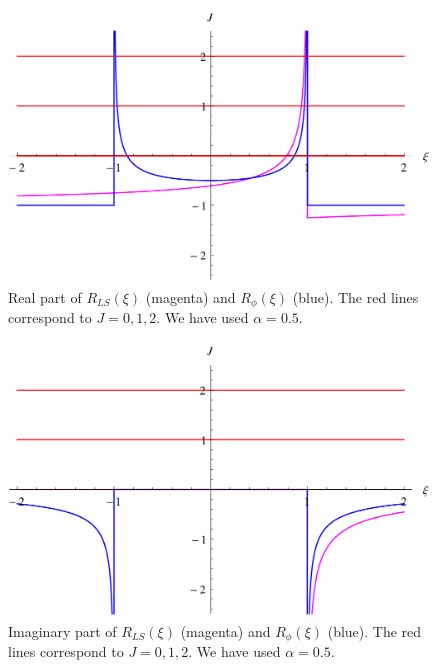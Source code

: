 \begin{figure}
\centering
\includegraphics[scale=0.6]{Plots/CompaRe2.pdf}
\caption[Comparison of the real part of $R_{LS}$ and $R_{\phi}$]{Real part of $R_{LS}(\xi)$ (magenta) and $R_{\phi}(\xi)$ (blue). The red lines correspond to $J = 0, 1, 2$. We have used $\alpha = 0.5$.}
\label{CompaReFig}
\end{figure}

\begin{figure}
\centering
\includegraphics[scale=0.6]{Plots/CompaIm2.pdf}
\caption[Comparison of the imaginary part of $R_{LS}$ and $R_{\phi}$]{Imaginary part of $R_{LS}(\xi)$ (magenta) and $R_{\phi}(\xi)$ (blue). The red lines correspond to $J = 0, 1, 2$. We have used $\alpha = 0.5$.}
\label{CompaImFig}
\end{figure}
